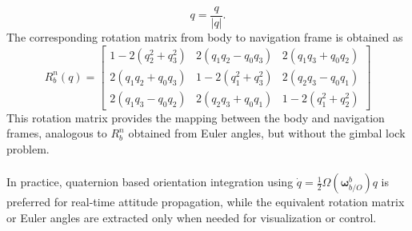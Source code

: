 $$
q = \frac{q}{|q|}.
$$
The corresponding rotation matrix from body to navigation frame is obtained as
$$
    R_b^n(q) =
    \begin{bmatrix}
        1 - 2(q_2^2 + q_3^2) & 2(q_1 q_2 - q_0 q_3) & 2(q_1 q_3 + q_0 q_2) \\
        2(q_1 q_2 + q_0 q_3) & 1 - 2(q_1^2 + q_3^2) & 2(q_2 q_3 - q_0 q_1) \\
        2(q_1 q_3 - q_0 q_2) & 2(q_2 q_3 + q_0 q_1) & 1 - 2(q_1^2 + q_2^2)
    \end{bmatrix}
$$
This rotation matrix provides the mapping between the body and navigation frames, analogous to $R_b^n$ obtained from Euler angles, but without the gimbal lock problem.  
\\ \\
In practice, quaternion based orientation integration using $\dot{q} = \frac{1}{2}\Omega(\boldsymbol{\omega}_{b/O}^{b})q$ is preferred for real-time attitude propagation, while the equivalent rotation matrix or Euler angles are extracted only when needed for visualization or control.



